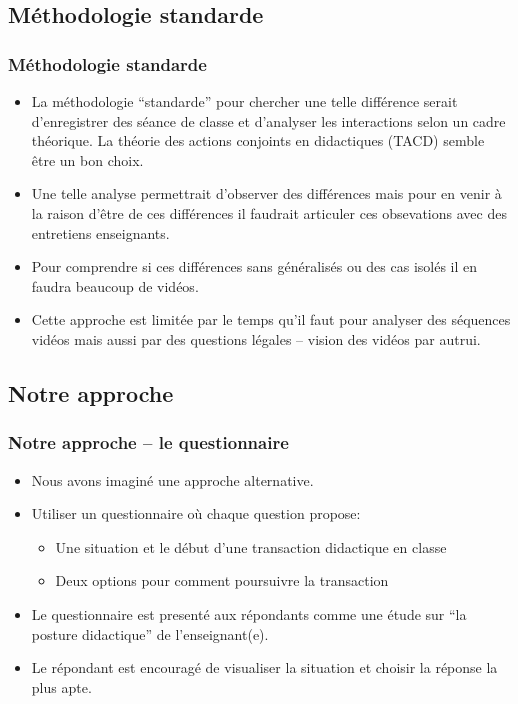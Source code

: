 \documentclass{beamer}
\begin{document}
\subsection{Méthodologie standarde}
\begin{frame}
\frametitle{Méthodologie standarde}
\begin{itemize}
\item La méthodologie ``standarde'' pour chercher une telle différence serait d'enregistrer des séance de classe et d'analyser
les interactions selon un cadre théorique. La théorie des actions conjoints en didactiques (TACD) semble être un bon choix.
\item Une telle analyse permettrait d'observer des différences mais pour en venir à la raison d'être de ces différences il faudrait articuler ces obsevations avec des entretiens enseignants.
\item Pour comprendre si ces différences sans généralisés ou des cas isolés il en faudra beaucoup de vidéos.
\item Cette approche est limitée par le temps qu'il faut pour analyser des séquences vidéos mais aussi par des questions
légales -- vision des vidéos par autrui.  
\end{itemize}
\end{frame}

\subsection{Notre approche}
\begin{frame}
\frametitle{Notre approche -- le questionnaire}
\begin{itemize}
\item Nous avons imaginé une approche alternative.
\item Utiliser un questionnaire où chaque question propose:
  \begin{itemize}
   \item Une situation et le début d'une transaction didactique en classe
   \item Deux options pour comment poursuivre la transaction 
  \end{itemize}
\item Le questionnaire est presenté aux répondants comme une étude sur
  ``la posture didactique'' de l'enseignant(e).
\item Le répondant est encouragé de visualiser la situation et choisir la
  réponse la plus apte. 
\end{itemize}
\end{frame}
\end{document}
